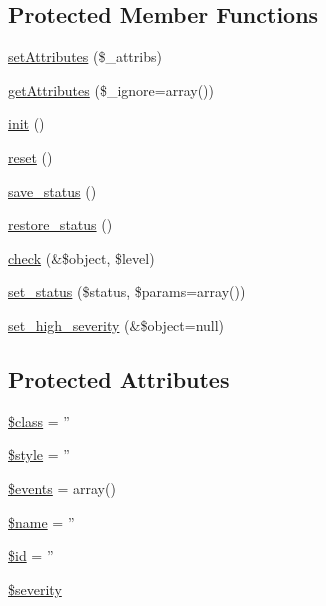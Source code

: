 \subsection*{Protected Member Functions}
\begin{DoxyCompactItemize}
\item 
\hyperlink{classBaseElement_aa623b042d23a5b77add8b3c452ec5855}{setAttributes} (\$\_\-attribs)
\item 
\hyperlink{classBaseElement_ae8237038633fc53db818f36da1940297}{getAttributes} (\$\_\-ignore=array())
\item 
\hyperlink{class__OWL_ae0ef3ded56e8a6b34b6461e5a721cd3e}{init} ()
\item 
\hyperlink{class__OWL_a2f2a042bcf31965194c03033df0edc9b}{reset} ()
\item 
\hyperlink{class__OWL_a9e49b9c76fbc021b244c6915ea536d71}{save\_\-status} ()
\item 
\hyperlink{class__OWL_a465eeaf40edd9f9c848841700c32ce55}{restore\_\-status} ()
\item 
\hyperlink{class__OWL_ad6f4f6946f40199dd0333cf219fa500e}{check} (\&\$object, \$level)
\item 
\hyperlink{class__OWL_aea912d0ede9b3c2a69b79072d94d4787}{set\_\-status} (\$status, \$params=array())
\item 
\hyperlink{class__OWL_a576829692a3b66e3d518853bf43abae3}{set\_\-high\_\-severity} (\&\$object=null)
\end{DoxyCompactItemize}
\subsection*{Protected Attributes}
\begin{DoxyCompactItemize}
\item 
\hyperlink{classBaseElement_a99976a8e967db92e7800309f359b0803}{\$class} = ''
\item 
\hyperlink{classBaseElement_a429a3d642dd95f30e1059ef29564b87d}{\$style} = ''
\item 
\hyperlink{classBaseElement_a02cebe45d277b4ff8f29db08bad371ba}{\$events} = array()
\item 
\hyperlink{classBaseElement_a30b8cff187a9de659a70daf287d66f45}{\$name} = ''
\item 
\hyperlink{classBaseElement_a11b6989c43b53869a09f5ce65aa55b45}{\$id} = ''
\item 
\hyperlink{class__OWL_ad26b40a9dbbacb33e299b17826f8327c}{\$severity}
\end{DoxyCompactItemize}

